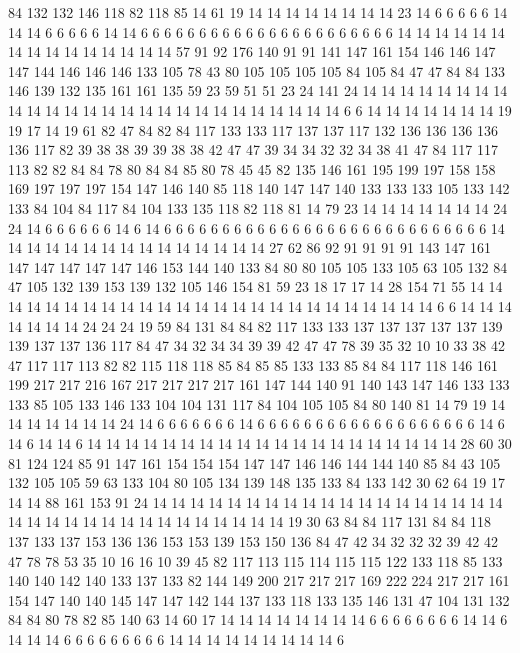 84 132 132 146 118 82 118 85 14 61 19 14 14 14 14 14 14 14 14 23
14 6 6 6 6 6 14 14 14 6 6 6 6 6 14 14 6 6 6 6
6 6 6 6 6 6 6 6 6 6 6 6 6 6 6 6 6 6 14 14
14 14 14 14 14 14 14 14 14 14 14 14 14 57 91 92 176 140 91 91
141 147 161 154 146 146 147 147 144 146 146 146 133 105 78 43 80 105 105 105
105 84 105 84 47 47 84 84 133 146 139 132 135 161 161 135 59 23 59 51
51 23 24 141 24 14 14 14 14 14 14 14 14 14 14 14 14 14 14 14
14 14 14 14 14 14 14 14 14 14 14 6 6 14 14 14 14 14 14 14
19 19 17 14 19 61 82 47 84 82 84 117 133 133 117 137 137 117 132 136
136 136 136 136 117 82 39 38 38 39 39 38 38 42 47 47 39 34 34 32
32 34 38 41 47 84 117 117 113 82 82 84 84 78 80 84 84 85 80 78
45 45 82 135 146 161 195 199 197 158 158 169 197 197 197 154 147 146 140 85
118 140 147 147 140 133 133 133 105 133 142 133 84 104 84 117 84 104 133 135
118 82 118 81 14 79 23 14 14 14 14 14 14 14 24 24 14 6 6 6
6 6 6 14 6 14 6 6 6 6 6 6 6 6 6 6 6 6 6 6
6 6 6 6 6 6 6 6 6 6 6 6 6 6 14 14 14 14 14 14
14 14 14 14 14 14 14 14 14 27 62 86 92 91 91 91 91 143 147 161
147 147 147 147 147 146 153 144 140 133 84 80 80 105 105 133 105 63 105 132
84 47 105 132 139 153 139 132 105 146 154 81 59 23 18 17 17 14 28 154
71 55 14 14 14 14 14 14 14 14 14 14 14 14 14 14 14 14 14 14
14 14 14 14 14 14 14 6 6 14 14 14 14 14 14 14 24 24 24 19
59 84 131 84 84 82 117 133 133 137 137 137 137 137 139 139 137 137 136 117
84 47 34 32 34 34 39 39 42 47 47 78 39 35 32 10 10 33 38 42
47 117 117 113 82 82 115 118 118 85 84 85 85 133 133 85 84 84 117 118
146 161 199 217 217 216 167 217 217 217 217 161 147 144 140 91 140 143 147 146
133 133 133 85 105 133 146 133 104 104 131 117 84 104 105 105 84 80 140 81
14 79 19 14 14 14 14 14 14 14 24 14 6 6 6 6 6 6 6 14
6 6 6 6 6 6 6 6 6 6 6 6 6 6 6 6 6 6 6 14
6 14 6 14 14 6 14 14 14 14 14 14 14 14 14 14 14 14 14 14
14 14 14 14 14 14 28 60 30 81 124 124 85 91 147 161 154 154 154 147
147 146 146 144 144 140 85 84 43 105 132 105 105 59 63 133 104 80 105 134
139 148 135 133 84 133 142 30 62 64 19 17 14 14 88 161 153 91 24 14
14 14 14 14 14 14 14 14 14 14 14 14 14 14 14 14 14 14 14 14
14 14 14 14 14 14 14 14 14 14 14 14 14 19 30 63 84 84 117 131
84 84 118 137 133 137 153 136 136 153 153 139 153 150 136 84 47 42 34 32
32 32 39 42 42 47 78 78 53 35 10 16 16 10 39 45 82 117 113 115
114 115 115 122 133 118 85 133 140 140 142 140 133 137 133 82 144 149 200 217
217 217 169 222 224 217 217 161 154 147 140 140 145 147 147 142 144 137 133 118
133 135 146 131 47 104 131 132 84 84 80 78 82 85 140 63 14 60 17 14
14 14 14 14 14 14 14 6 6 6 6 6 6 6 6 14 14 6 14 14
14 6 6 6 6 6 6 6 6 6 14 14 14 14 14 14 14 14 14 6

